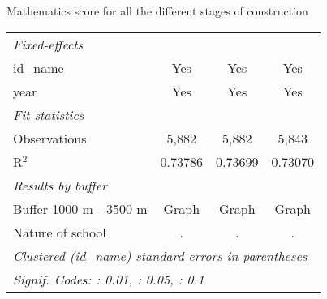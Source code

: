 \documentclass[9pt]{beamer}
\begin{document}
\begin{frame}{Mathematics score for all the different stages of construction 
\hyperlink{math100p}{}   }
\begin{center}
\begin{tabular}{lccc}
   \midrule
   \emph{Fixed-effects}\\
   id\_name     & Yes             & Yes            & Yes\\  
   year         & Yes             & Yes            & Yes\\  
   \midrule
   \emph{Fit statistics}\\
   Observations & 5,882           & 5,882          & 5,843\\  
   R$^2$        & 0.73786         & 0.73699        & 0.73070\\  
   \midrule  
   \emph{Results by buffer}\\
   Buffer 1000 m - 3500 m  &  Graph\hyperlink{10p_math_buf}{\beamergotobutton{ }}            &  Graph\hyperlink{50p_math_buf}{\beamergotobutton{}}             &  Graph\hyperlink{100p_math_buf}{\beamergotobutton{}}     \\
    Nature of school &  .\hyperlink{10p_math_nat}{\beamerbutton{ !}}            &  .\hyperlink{50p_math_nat}{\beamerbutton{ !}}             &  .\hyperlink{100p_math_nat}{\beamerbutton{ !}}    \\   
   \midrule  
   \multicolumn{4}{l}{\emph{Clustered (id\_name) standard-errors in parentheses}}\\
   \multicolumn{4}{l}{\emph{Signif. Codes: : 0.01, : 0.05, : 0.1}}\\
   \midrule
\end{tabular}
 
 
 \end{center}
\end{frame}
\end{document}
